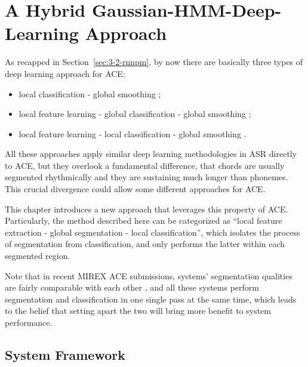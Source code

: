 
\chapter{A Hybrid Gaussian-HMM-Deep-Learning Approach}\label{cp:ghmm} %


As recapped in Section~\ref{sec:3-2-rnnpm}, by now there are basically three types of deep learning approach for ACE:
\begin{itemize}
\item local classification - global smoothing \cite{humphrey2012rethinking};
\item local feature learning - global classification - global smoothing \cite{boulanger2013audio,sigtia2015audio};
\item local feature learning - local classification - global smoothing \cite{zhou2015chord}.
\end{itemize}
All these approaches apply similar deep learning methodologies in ASR \cite{deng2014deep,bourlard2012connectionist} directly to ACE, but they overlook a fundamental difference, that chords are usually segmented rhythmically and they are sustaining much longer than phonemes. This crucial divergence could allow some different approaches for ACE.

This chapter introduces a new approach that leverages this property of ACE. Particularly, the method described here can be categorized as ``local feature extraction - global segmentation - local classification'', which isolates the process of segmentation from classification, and only performs the latter within each segmented region. 

Note that in recent MIREX ACE submissions, systems' segmentation qualities are fairly comparable with each other \cite{burgoyne2014comparative}, and all these systems perform segmentation and classification in one single pass at the same time, which leads to the belief that setting apart the two will bring more benefit to system performance.


\section{System Framework} \label{sec:3-sysframe}

